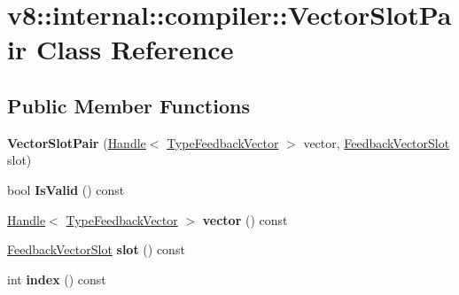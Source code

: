 \hypertarget{classv8_1_1internal_1_1compiler_1_1_vector_slot_pair}{}\section{v8\+:\+:internal\+:\+:compiler\+:\+:Vector\+Slot\+Pair Class Reference}
\label{classv8_1_1internal_1_1compiler_1_1_vector_slot_pair}
\subsection*{Public Member Functions}
\begin{DoxyCompactItemize}
\item 
{\bfseries Vector\+Slot\+Pair} (\hyperlink{classv8_1_1internal_1_1_handle}{Handle}$<$ \hyperlink{classv8_1_1internal_1_1_type_feedback_vector}{Type\+Feedback\+Vector} $>$ vector, \hyperlink{classv8_1_1internal_1_1_feedback_vector_slot}{Feedback\+Vector\+Slot} slot)\hypertarget{classv8_1_1internal_1_1compiler_1_1_vector_slot_pair_a97ae8bda18d4d8cfaf8007a7eb1a3244}{}\label{classv8_1_1internal_1_1compiler_1_1_vector_slot_pair_a97ae8bda18d4d8cfaf8007a7eb1a3244}

\item 
bool {\bfseries Is\+Valid} () const \hypertarget{classv8_1_1internal_1_1compiler_1_1_vector_slot_pair_abf310fb94040555c016b7e496c0c9450}{}\label{classv8_1_1internal_1_1compiler_1_1_vector_slot_pair_abf310fb94040555c016b7e496c0c9450}

\item 
\hyperlink{classv8_1_1internal_1_1_handle}{Handle}$<$ \hyperlink{classv8_1_1internal_1_1_type_feedback_vector}{Type\+Feedback\+Vector} $>$ {\bfseries vector} () const \hypertarget{classv8_1_1internal_1_1compiler_1_1_vector_slot_pair_ae50cb931792caf5754310f10e4a1c1c5}{}\label{classv8_1_1internal_1_1compiler_1_1_vector_slot_pair_ae50cb931792caf5754310f10e4a1c1c5}

\item 
\hyperlink{classv8_1_1internal_1_1_feedback_vector_slot}{Feedback\+Vector\+Slot} {\bfseries slot} () const \hypertarget{classv8_1_1internal_1_1compiler_1_1_vector_slot_pair_a52009e9e3c9d6d0759ba9f7233be76cb}{}\label{classv8_1_1internal_1_1compiler_1_1_vector_slot_pair_a52009e9e3c9d6d0759ba9f7233be76cb}

\item 
int {\bfseries index} () const \hypertarget{classv8_1_1internal_1_1compiler_1_1_vector_slot_pair_a834e67c101c7472e81886f892a35c658}{}\label{classv8_1_1internal_1_1compiler_1_1_vector_slot_pair_a834e67c101c7472e81886f892a35c658}

\end{DoxyCompactItemize}

